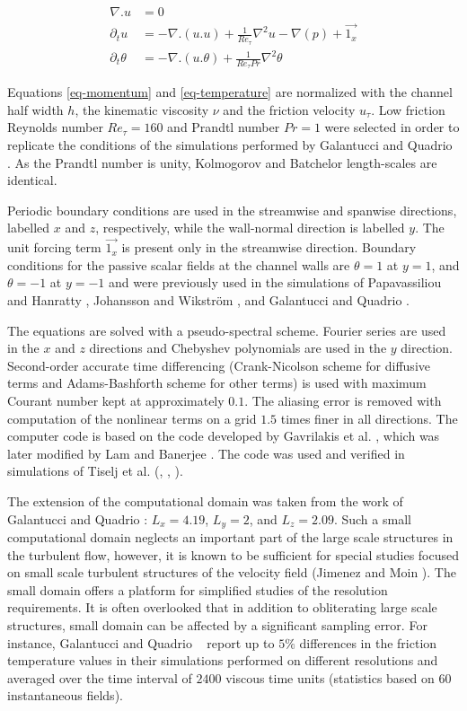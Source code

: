 \documentclass[review]{elsarticle}
\newcommand{\gqcite}{Galantucci and Quadrio \cite{galantucci2010very}}
\begin{document}
\begin{align}
\nabla . u & = 0 \label{eq-continuity} \\
\partial_t u & = - \nabla . \left( u . u \right) + \frac{1}{Re_\tau} \nabla^2 u - \nabla \left( p \right) + \overrightarrow{1_x} \label{eq-momentum} \\
\partial_t \theta & = - \nabla . \left( u . \theta \right) + \frac{1}{Re_\tau Pr} \nabla^2 \theta \label{eq-temperature}
\end{align}

Equations \eqref{eq-momentum} and \eqref{eq-temperature} are normalized with the channel half width $h$, the kinematic viscosity $\nu$ and the friction velocity $u_\tau$. Low friction Reynolds number $Re_\tau=160$ and Prandtl number $Pr=1$ were selected in order to replicate the conditions of the simulations performed by \gqcite. As the Prandtl number is unity, Kolmogorov and Batchelor length-scales are identical.

Periodic boundary conditions are used in the streamwise and spanwise directions, labelled $x$ and $z$, respectively, while the wall-normal direction is labelled $y$. The unit forcing term $\overrightarrow{1_x}$ is present only in the streamwise direction. Boundary conditions for the passive scalar fields at the channel walls are $\theta=1$ at $y=1$, and $\theta=-1$ at $y=-1$ and were previously used in the simulations of Papavassiliou and Hanratty \cite{papavassiliou1997transport}, Johansson and Wikstr{\"o}m \cite{johansson2000dns}, and \gqcite.

The equations are solved with a pseudo-spectral scheme. Fourier series are used in the $x$ and $z$ directions and Chebyshev polynomials are used in the $y$ direction. Second-order accurate time differencing (Crank-Nicolson scheme for diffusive terms and Adams-Bashforth scheme for other terms) is used with maximum Courant number kept at approximately $0.1$. The aliasing error is removed with computation of the nonlinear terms on a grid $1.5$ times finer in all directions. The computer code is based on the code developed by Gavrilakis et al. \cite{gavrilakis1986direct}, which was later modified by Lam and Banerjee \cite{lam1988investigation}. The code was used and verified in simulations of Tiselj et al. (\cite{tiselj2001effect}, \cite{tiselj2012dns}, \cite{tiselj2014tracking}).

The extension of the computational domain was taken from the work of \gqcite: $L_x=4.19$, $L_y=2$, and $L_z=2.09$. Such a small computational domain neglects an important part of the large scale structures in the turbulent flow, however, it is known to be sufficient for special studies focused on small scale turbulent structures of the velocity field (Jimenez and Moin \cite{jimenez1991minimal}). The small domain offers a platform for simplified studies of the resolution requirements. It is often overlooked that in addition to obliterating large scale structures, small domain can be affected by a significant sampling error. For instance, \gqcite ~ report up to $5\%$ differences in the friction temperature values in their simulations performed on different resolutions and averaged over the time interval of $2400$ viscous time units (statistics based on $60$ instantaneous fields).
\end{document}
